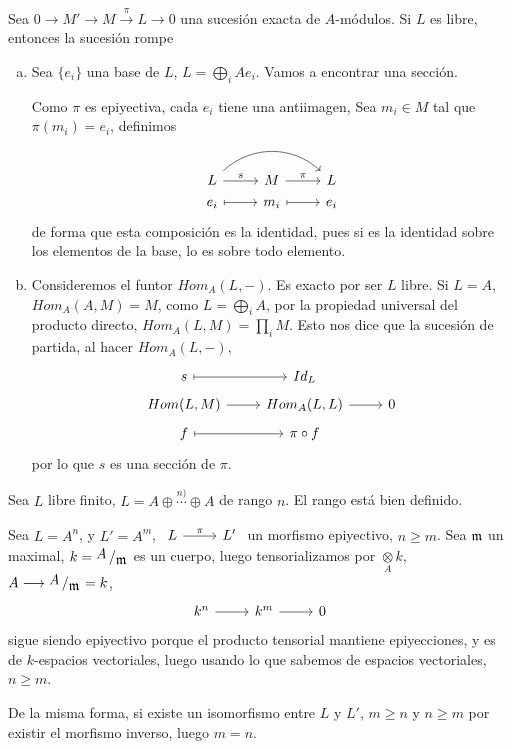 \begin{ejer}
    Sea $0 \longrightarrow M' \longrightarrow M \overset{\pi}{\longrightarrow} L \longrightarrow 0$ una sucesi\'on exacta de $A$-m\'odulos. Si $L$ es libre, entonces la sucesi\'on rompe 
\end{ejer}
\begin{sol}
    \begin{enumerate}[a)]
        \item Sea $\{e_i\}$ una base de $L$, $\displaystyle L = \bigoplus_i Ae_i$. Vamos a encontrar una secci\'on. 

        Como $\pi$ es epiyectiva, cada $e_i$ tiene una antiimagen, Sea $m_i\in M$ tal que $\pi(m_i) = e_i$, definimos 
        $$\bt L \arrow[bend left=15mm] {rr} \arrow{r}{s} & M \arrow{r}{\pi} & L \\[-5mm] e_i \arrow[mapsto]{r}&  m_i\arrow[mapsto]{r}& e_i \et$$
        de forma que esta composici\'on es la identidad, pues si es la identidad sobre los elementos de la base, lo es sobre todo elemento.
        \item Consideremos el funtor $Hom_A (L,-)$. Es exacto por ser $L$ libre. Si $L= A$, \\ $Hom_A(A,M) = M$, como $L = \bigoplus_i A$, por la propiedad universal del producto directo, $Hom_A(L,M) = \prod_i M$. Esto nos dice que la sucesi\'on de partida, al hacer $Hom_A(L,-)$, 
        $$\bt s \arrow[mapsto]{r} & Id_L \\[-5mm] Hom(L,M) \arrow{r} & Hom_A(L,L) \arrow{r} & 0 \\[-5mm]
        f \arrow[mapsto]{r} & \pi \circ f \et$$
        por lo que $s$ es una secci\'on de $\pi$. 
    \end{enumerate}
\end{sol}
\begin{ejer}
    Sea $L$ libre finito, $L = A\oplus \overset{n)}{\cdots} \oplus A$ de rango $n$. El rango est\'a bien definido.
\end{ejer}
\begin{sol}
     Sea $L = A^n$, y $L'=A^m$, $\bt L \arrow{r}{\pi} & L' \et$ un morfismo epiyectivo, 
     $n \geq m$. Sea $\mathfrak{m}$ un maximal, $k =\modulo{A}{\m}$ es un cuerpo, luego tensorializamos por $\underset{A}{\otimes}  k$, $A \longrightarrow \modulo{A}{\m} = k$, 
     $$\bt k^n \arrow{r} & k^m \arrow{r} & 0 \et$$
     sigue siendo epiyectivo porque el producto tensorial mantiene epiyecciones, y es de $k$-espacios vectoriales, luego usando lo que sabemos de espacios vectoriales, $n \geq m$.

     De la misma forma, si existe un isomorfismo entre $L$ y $L'$, $m \geq n$ y $n \geq m$ por existir el morfismo inverso, luego $m = n$. 
\end{sol}
